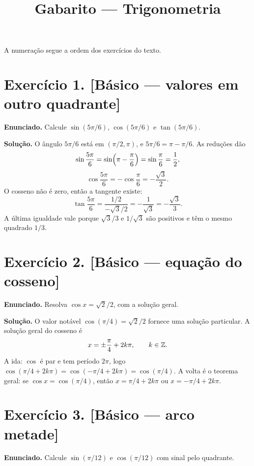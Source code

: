 \documentclass[11pt,a4paper]{article}
\title{Gabarito --- Trigonometria}
\author{}
\date{}
\begin{document}
\maketitle
\tableofcontents

A numeração segue a ordem dos exercícios do texto.

\section*{Exercício 1. [Básico --- valores em outro quadrante]}

\textbf{Enunciado.} Calcule $\sin(5\pi/6)$, $\cos(5\pi/6)$ e $\tan(5\pi/6)$.

\textbf{Solução.}
O ângulo $5\pi/6$ está em $(\pi/2,\pi)$, e $5\pi/6=\pi-\pi/6$. As reduções dão
\[
\sin\frac{5\pi}{6}=\sin\Bigl(\pi-\frac{\pi}{6}\Bigr)=\sin\frac{\pi}{6}=\frac12,
\]
\[
\cos\frac{5\pi}{6}=-\cos\frac{\pi}{6}=-\frac{\sqrt{3}}{2}.
\]
O cosseno não é zero, então a tangente existe:
\[
\tan\frac{5\pi}{6}
=\frac{1/2}{-\sqrt{3}/2}
=-\frac{1}{\sqrt{3}}
=-\frac{\sqrt{3}}{3}.
\]
A última igualdade vale porque $\sqrt{3}/3$ e $1/\sqrt{3}$ são positivos e têm o mesmo quadrado $1/3$.

\section*{Exercício 2. [Básico --- equação do cosseno]}

\textbf{Enunciado.} Resolva $\cos x=\sqrt{2}/2$, com a solução geral.

\textbf{Solução.}
O valor notável $\cos(\pi/4)=\sqrt{2}/2$ fornece uma solução particular. A solução geral do cosseno é
\[
x=\pm\frac{\pi}{4}+2k\pi,\qquad k\in\mathbb{Z}.
\]
A ida: $\cos$ é par e tem período $2\pi$, logo $\cos(\pi/4+2k\pi)=\cos(-\pi/4+2k\pi)=\cos(\pi/4)$. A volta é o teorema geral: se $\cos x=\cos(\pi/4)$, então $x=\pi/4+2k\pi$ ou $x=-\pi/4+2k\pi$.

\section*{Exercício 3. [Básico --- arco metade]}

\textbf{Enunciado.} Calcule $\sin(\pi/12)$ e $\cos(\pi/12)$ com sinal pelo quadrante.
\end{document}
